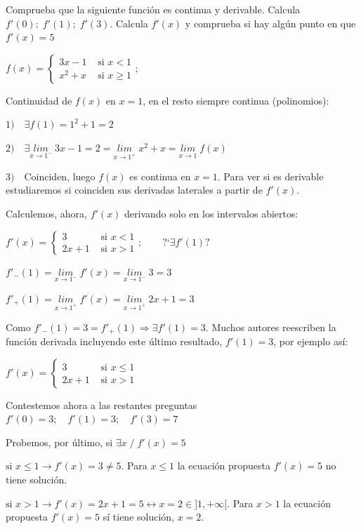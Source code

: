 	\begin{ejre} 	Comprueba que la siguiente función es continua y derivable. Calcula $f'(0);\; f'(1);\; f'(3)$. Calcula $f'(x)$ y comprueba si hay algún punto en que $f'(x)=5$
	
			$f(x)=
		\begin{cases}
		3x-1 & \mbox{ si } x< 1 \\
		x^2+x & \mbox{ si } x\ge 1  
		\end{cases} ;$
	\end{ejre}
	
	\begin{proofw}\renewcommand{\qedsymbol}{$\diamond$}
	
	Continuidad de $f(x)$ en $x=1$, en el resto siempre continua (polinomios):
	
	$1) \quad \exists f(1)=1^2+1=2$
	
	$2) \quad \exists \underset{x\to 1^-}{lim}\;{3x-1}=2=\underset{x\to 1^+}{lim}\;{x^2+x}=\underset{x\to 1}{lim}\;{f(x)}$
	
	$3) \quad $Coinciden, luego $f(x)$ es continua en $x=1$. Para ver si es derivable estudiaremos si coinciden sus derivadas laterales a partir de $f'(x)$.
	
	Calculemos, ahora, $f'(x)$ derivando solo en los intervalos abiertos:
	
	$f'(x)=
		\begin{cases}
		3 & \mbox{ si } x< 1 \\
		2x+1 & \mbox{ si } x >1  
		\end{cases} ; \qquad \mbox{?`} \exists f'(1)?$
		
		$f'_-(1)=\underset{x\to 1^-}{lim}\;{f'(x)}=\underset{x\to 1^-}{lim}\;{3}=3$
		
		$f'_+(1)=\underset{x\to 1^+}{lim}\;{f'(x)}=\underset{x\to 1^+}{lim}\;{2x+1}=3$
		
		Como $f'_-(1)=3=f'_+(1) \Rightarrow \exists f'(1)=3$. Muchos autores reescriben la función derivada incluyendo este último resultado, $f'(1)=3$, por ejemplo así:
		
			$f'(x)=
		\begin{cases}
		3 & \mbox{ si } x\le 1 \\
		2x+1 & \mbox{ si } x >1  
		\end{cases} $
		
		Contestemos ahora a las restantes preguntas $f'(0)= 3;\quad f'(1)=3;\quad  f'(3)=7$
		
		Probemos, por último, si $\exists x \; / \;  f'(x)=5$
		
		$\mbox{si }x\le 1 \to f'(x)=3 \neq 5$. Para $x\le 1$ la ecuación propuesta $f'(x)=5$ no tiene solución.
		
		$\mbox{si }x> 1 \to f'(x)=2x+1 =5 \leftrightarrow x=2 \in ]1,+\infty[$. Para $x> 1$ la ecuación propuesta $f'(x)=5$ sí tiene solución, $x=2$.
		
	
	\end{proofw}
	
